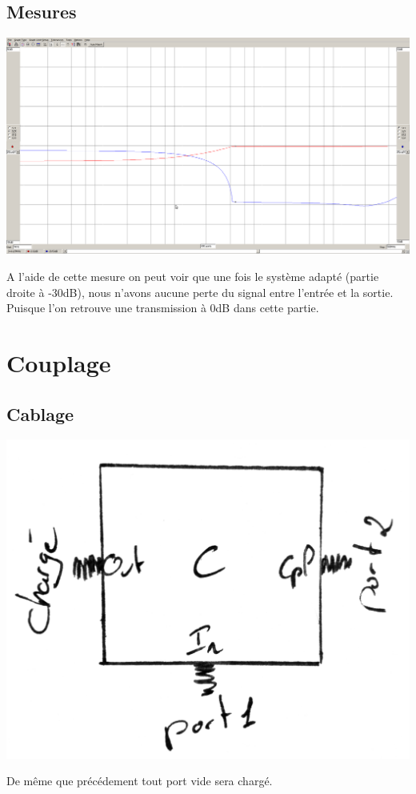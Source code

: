 \documentclass[a4paper,12pt]{report}            %
\begin{document}
\subsection{Mesures}
\begin{center}\includegraphics[scale = 0.25]{pic/cdio.png} \\ \end{center}
A l'aide de cette mesure on peut voir que une fois le système adapté (partie droite à -30dB), nous 
n'avons aucune perte du signal entre l'entrée et la sortie. Puisque l'on retrouve une transmission à
0dB dans cette partie.
\section{Couplage}
\subsection{Cablage}
\begin{center}\includegraphics[scale = 0.17]{pic/CDIC.png}\\ \end{center}
De même que précédement tout port vide sera chargé.
\newpage 
\end{document}

